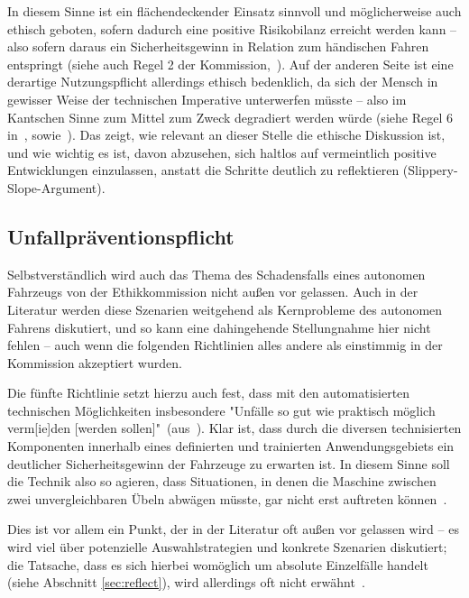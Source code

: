 \documentclass[twocolumn, german]{tum-article}
\begin{document}
In diesem Sinne ist ein flächendeckender Einsatz sinnvoll und möglicherweise auch ethisch geboten, sofern dadurch eine positive Risikobilanz erreicht werden kann -- also sofern daraus ein Sicherheitsgewinn in Relation zum händischen Fahren entspringt (siehe auch Regel 2 der Kommission,~\cite[S. 10]{ethik-komission}).
Auf der anderen Seite ist eine derartige Nutzungspflicht allerdings ethisch bedenklich, da sich der Mensch in gewisser Weise der technischen Imperative unterwerfen müsste -- also im Kantschen Sinne zum Mittel zum Zweck degradiert werden würde (siehe Regel 6 in~\cite[S. 11]{ethik-komission}, sowie~\cite[S. 551]{ethics-code}).
Das zeigt, wie relevant an dieser Stelle die ethische Diskussion ist, und wie wichtig es ist, davon abzusehen, sich haltlos auf vermeintlich positive Entwicklungen einzulassen, anstatt die Schritte deutlich zu reflektieren (Slippery-Slope-Argument).


\subsection{Unfallpräventionspflicht}
Selbstverständlich wird auch das Thema des Schadensfalls eines autonomen Fahrzeugs von der Ethikkommission nicht außen vor gelassen.
Auch in der Literatur werden diese Szenarien weitgehend als Kernprobleme des autonomen Fahrens diskutiert, und so kann eine dahingehende Stellungnahme hier nicht fehlen -- auch wenn die folgenden Richtlinien alles andere als einstimmig in der Kommission akzeptiert wurden.

Die fünfte Richtlinie setzt hierzu auch fest, dass mit den automatisierten technischen Möglichkeiten insbesondere "Unfälle so gut wie praktisch möglich verm[ie]den [werden sollen]"~(aus~\cite[S. 10]{ethik-komission}).
Klar ist, dass durch die diversen technisierten Komponenten innerhalb eines definierten und trainierten Anwendungsgebiets ein deutlicher Sicherheitsgewinn der Fahrzeuge zu erwarten ist.
In diesem Sinne soll die Technik also so agieren, dass Situationen, in denen die Maschine zwischen zwei unvergleichbaren Übeln abwägen müsste, gar nicht erst auftreten können~\cite[S. 10]{ethik-komission}.

Dies ist vor allem ein Punkt, der in der Literatur oft außen vor gelassen wird -- es wird viel über potenzielle Auswahlstrategien und konkrete Szenarien diskutiert; die Tatsache, dass es sich hierbei womöglich um absolute Einzelfälle handelt (siehe Abschnitt \vref{sec:reflect}), wird allerdings oft nicht erwähnt~\cite[S. 551]{ethics-code}.
\end{document}
